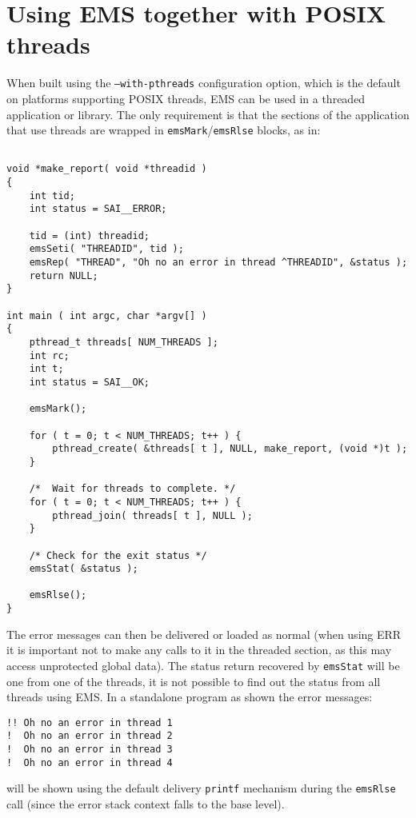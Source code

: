\documentclass[twoside,11pt]{article}
\newcommand{\xlabel}[1]{}
\renewcommand{\_}{\texttt{\symbol{95}}}
\begin{document}
\section{\xlabel{threading}Using EMS together with POSIX threads
\label{threading}}
When built using the \texttt{--with-pthreads} configuration option, which is
the default on platforms supporting POSIX threads, EMS can be used in a
threaded application or library. The only requirement is that the sections of
the application that use threads are wrapped in
\texttt{emsMark}/\texttt{emsRlse} blocks, as in:
\begin{verbatim}

void *make_report( void *threadid )
{
    int tid;
    int status = SAI__ERROR;

    tid = (int) threadid;
    emsSeti( "THREADID", tid );
    emsRep( "THREAD", "Oh no an error in thread ^THREADID", &status );
    return NULL;
}

int main ( int argc, char *argv[] )
{
    pthread_t threads[ NUM_THREADS ];
    int rc;
    int t;
    int status = SAI__OK;

    emsMark();

    for ( t = 0; t < NUM_THREADS; t++ ) {
        pthread_create( &threads[ t ], NULL, make_report, (void *)t );
    }

    /*  Wait for threads to complete. */
    for ( t = 0; t < NUM_THREADS; t++ ) {
        pthread_join( threads[ t ], NULL );
    }

    /* Check for the exit status */
    emsStat( &status );

    emsRlse();
}

\end{verbatim}

The error messages can then be delivered or loaded as normal (when using ERR
it is important not to make any calls to it in the threaded section, as this
may access unprotected global data). The status return recovered by
\texttt{emsStat} will be one from one of the threads, it is not possible to
find out the status from all threads using EMS. In a standalone program as
shown the error messages:
\begin{verbatim}
!! Oh no an error in thread 1
!  Oh no an error in thread 2
!  Oh no an error in thread 3
!  Oh no an error in thread 4
\end{verbatim}
will be shown using the default delivery \texttt{printf} mechanism during the
\texttt{emsRlse} call (since the error stack context falls to the base level).
\end{document}
